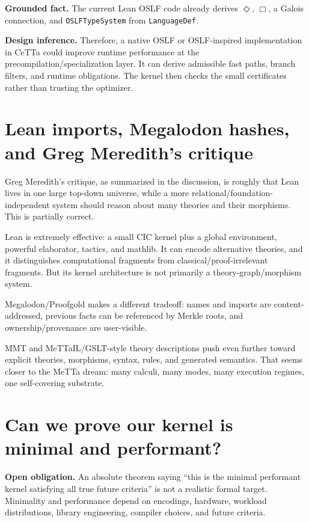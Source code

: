 \documentclass[11pt]{article}
\newcommand{\MeTTa}{\textup{MeTTa}}
\newcommand{\MeTTaIL}{\textup{MeTTaIL}}
\newcommand{\Megalodon}{\textup{Megalodon}}
\newcommand{\OSLF}{\textup{OSLF}}
\newcommand{\Lean}{\textup{Lean}}
\newcommand{\MMT}{\textup{MMT}}
\newcommand{\code}[1]{\texttt{#1}}
\newcommand{\Fact}{\textbf{Grounded fact.}}
\newcommand{\Infer}{\textbf{Design inference.}}
\newcommand{\Open}{\textbf{Open obligation.}}
\begin{document}
\Fact{} The current Lean \OSLF{} code already derives \(\Diamond\), \(\Box\), a Galois connection, and \code{OSLFTypeSystem} from \code{LanguageDef}.\cite{oslf-typesynthesis,oslf-typesynthesis2}

\Infer{} Therefore, a native \OSLF{} or \OSLF{}-inspired implementation in CeTTa could improve runtime performance at the precompilation/specialization layer.  It can derive admissible fast paths, branch filters, and runtime obligations.  The kernel then checks the small certificates rather than trusting the optimizer.

\section{Lean imports, Megalodon hashes, and Greg Meredith's critique}

Greg Meredith's critique, as summarized in the discussion, is roughly that Lean lives in one large top-down universe, while a more relational/foundation-independent system should reason about many theories and their morphisms.  This is partially correct.

\Lean{} is extremely effective: a small CIC kernel plus a global environment, powerful elaborator, tactics, and mathlib.  It can encode alternative theories, and it distinguishes computational fragments from classical/proof-irrelevant fragments.  But its kernel architecture is not primarily a theory-graph/morphism system.

\Megalodon{}/Proofgold makes a different tradeoff: names and imports are content-addressed, previous facts can be referenced by Merkle roots, and ownership/provenance are user-visible.\cite{megalodon-examples}

\MMT{} and \MeTTaIL{}/GSLT-style theory descriptions push even further toward explicit theories, morphisms, syntax, rules, and generated semantics.  That seems closer to the \MeTTa{} dream: many calculi, many modes, many execution regimes, one self-covering substrate.

\section{Can we prove our kernel is minimal and performant?}

\Open{} An absolute theorem saying ``this is the minimal performant kernel satisfying all true future criteria'' is not a realistic formal target.  Minimality and performance depend on encodings, hardware, workload distributions, library engineering, compiler choices, and future criteria.
\end{document}
